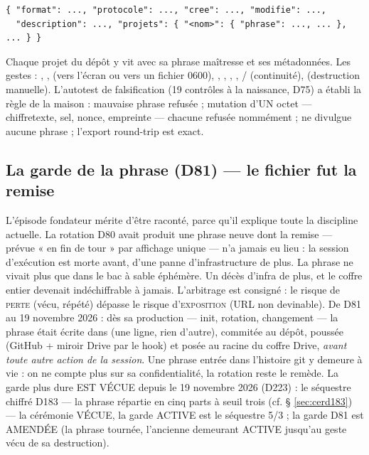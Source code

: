 \begin{lstlisting}
{ "format": ..., "protocole": ..., "cree": ..., "modifie": ...,
  "description": ..., "projets": { "<nom>": { "phrase": ..., ... }, ... } }
\end{lstlisting}

Chaque projet du dépôt y vit avec sa phrase maîtresse et ses métadonnées. Les gestes :
, ,  (vers l'écran ou vers un fichier 0600),
, , , ,
/ (continuité),  (destruction manuelle).
L'autotest de falsification (19 contrôles à la naissance, D75) a établi la règle de la
maison : mauvaise phrase refusée ; mutation d'UN octet — chiffretexte, sel, nonce,
empreinte — chacune refusée nommément ;  ne divulgue aucune phrase ;
l'export round-trip est exact.

\subsection{La garde de la phrase (D81) — le fichier fut la remise}\label{sec:guarded81}

L'épisode fondateur mérite d'être raconté, parce qu'il explique toute la discipline
actuelle. La rotation D80 avait produit une phrase neuve dont la remise — prévue « en
fin de tour » par affichage unique — n'a jamais eu lieu : la session d'exécution est
morte avant, d'une panne d'infrastructure de plus. La phrase ne vivait plus que dans le
bac à sable éphémère. Un décès d'infra de plus, et le coffre entier devenait
indéchiffrable à jamais. L'arbitrage est consigné : le risque de \textsc{perte} (vécu,
répété) dépasse le risque d'\textsc{exposition} (URL non devinable). De D81 au 19 novembre 2026 : dès sa
production — init, rotation, changement — la phrase était écrite dans
 (une ligne, rien d'autre), commitée au dépôt, poussée
(GitHub + miroir Drive par le hook) et posée au racine du coffre Drive, \emph{avant
toute autre action de la session}. Une phrase entrée dans l'histoire git y demeure à
vie : on ne compte plus sur sa confidentialité, la rotation reste le remède.
La garde plus dure EST VÉCUE depuis le 19 novembre 2026 (D223) : le
séquestre chiffré D183 — la phrase répartie en cinq parts à seuil trois
(cf. § \ref{sec:cerd183}) — la cérémonie VÉCUE, la garde ACTIVE est le
séquestre 5/3 ; la garde D81 est AMENDÉE (la phrase tournée, l'ancienne
demeurant ACTIVE jusqu'au geste vécu de sa destruction).

